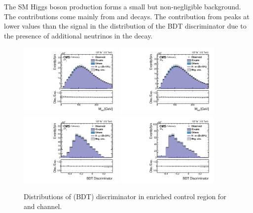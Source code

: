 The SM Higgs boson production forms a small but non-negligible background. The contributions come mainly from \Htt and \HWW decays. The contribution from \HWW peaks at lower values than the signal in the distribution of the BDT discriminator due to the presence of additional neutrinos in the decay.

\begin{figure}[htbp!]
  \centering
  \includegraphics[width=0.45\textwidth]{plots/chapter7/Fake/mue/TT.pdf}
  \includegraphics[width=0.45\textwidth]{plots/chapter7/Fake/emu/TT.pdf}
  \includegraphics[width=0.45\textwidth]{plots/chapter7/Fake/mue/TTBDT.pdf}
  \includegraphics[width=0.45\textwidth]{plots/chapter7/Fake/emu/TTBDT.pdf}
  \caption{Distributions of \mcol (BDT) discriminator in \ttbar enriched control region for \mue and \emu channel.}
  \label{fig:tt_control}
\end{figure}
